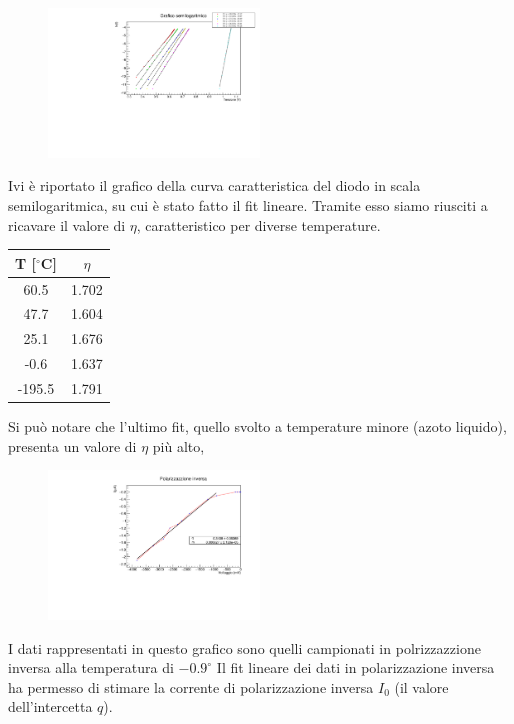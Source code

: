 \documentclass[10pt,twocolumn]{article}
\begin{document}
\begin{figure}[H] %
  \centering
  \includegraphics[width=0.5\textwidth]{scala_semilogaritmica.pdf} %
  \label{fig:I_V_}
\end{figure}
Ivi è riportato il grafico della curva caratteristica del diodo in scala semilogaritmica,
su cui è stato fatto il fit lineare. 
Tramite esso siamo riusciti a ricavare il valore di $\eta$, 
caratteristico per diverse temperature.

\begin{table}[H]
	\centering
	\begin{tabular}{|c|c|}
		\hline
		\textbf{T} [$^\circ$C] & \textbf{$\eta$} \\ \hline
    60.5 & 1.702 \\ \hline
    47.7 & 1.604 \\ \hline
    25.1 & 1.676 \\ \hline
    -0.6 & 1.637 \\ \hline
    -195.5 & 1.791 \\ \hline
	\end{tabular}
\end{table}
Si può notare che l'ultimo fit, quello svolto a temperature minore (azoto liquido), presenta un valore di $\eta$  più alto,

\begin{figure}[H] %
  \centering
  \includegraphics[width=0.5\textwidth]{pol_inv.pdf} %
  \label{fig:V}
\end{figure}
I dati rappresentati in questo grafico sono quelli campionati in polrizzazzione inversa alla temperatura di $-0.9^\circ$
Il fit lineare dei dati in polarizzazione inversa ha permesso di stimare la corrente di polarizzazione inversa $I_0$ 
(il valore  dell'intercetta $q$).
\end{document}
